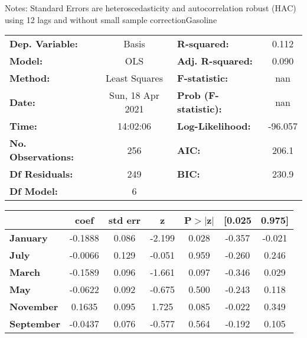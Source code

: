 Notes: \newline
 [1] Standard Errors are heteroscedasticity and autocorrelation robust (HAC) using 12 lags and without small sample correctionGasoline\begin{center}
\begin{tabular}{lclc}
\toprule
\textbf{Dep. Variable:}    &      Basis       & \textbf{  R-squared:         } &     0.112   \\
\textbf{Model:}            &       OLS        & \textbf{  Adj. R-squared:    } &     0.090   \\
\textbf{Method:}           &  Least Squares   & \textbf{  F-statistic:       } &       nan   \\
\textbf{Date:}             & Sun, 18 Apr 2021 & \textbf{  Prob (F-statistic):} &      nan    \\
\textbf{Time:}             &     14:02:06     & \textbf{  Log-Likelihood:    } &   -96.057   \\
\textbf{No. Observations:} &         256      & \textbf{  AIC:               } &     206.1   \\
\textbf{Df Residuals:}     &         249      & \textbf{  BIC:               } &     230.9   \\
\textbf{Df Model:}         &           6      & \textbf{                     } &             \\
\bottomrule
\end{tabular}
\begin{tabular}{lcccccc}
                   & \textbf{coef} & \textbf{std err} & \textbf{z} & \textbf{P$> |$z$|$} & \textbf{[0.025} & \textbf{0.975]}  \\
\midrule
\textbf{January}   &      -0.1888  &        0.086     &    -2.199  &         0.028        &       -0.357    &       -0.021     \\
\textbf{July}      &      -0.0066  &        0.129     &    -0.051  &         0.959        &       -0.260    &        0.246     \\
\textbf{March}     &      -0.1589  &        0.096     &    -1.661  &         0.097        &       -0.346    &        0.029     \\
\textbf{May}       &      -0.0622  &        0.092     &    -0.675  &         0.500        &       -0.243    &        0.118     \\
\textbf{November}  &       0.1635  &        0.095     &     1.725  &         0.085        &       -0.022    &        0.349     \\
\textbf{September} &      -0.0437  &        0.076     &    -0.577  &         0.564        &       -0.192    &        0.105     \\

\end{tabular}
\end{center}
